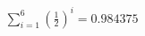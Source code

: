 \documentclass[preview]{standalone}
\begin{document}
\begin{align*}
\sum_{i=1}^{6} (\frac{1}{2})^i = {0.984375}
\end{align*}
\end{document}
